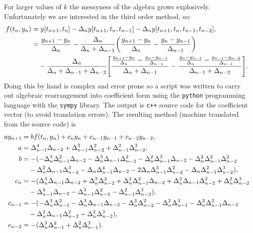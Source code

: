 For larger values of $k$ the messyness of the algebra grows explosively.
Unfortunately we are interested in the third order method, so:
\begin{equation}
  \begin{aligned}
    f(t_n, y_n) &= y[t_{n+1}, t_n] - \Delta_{n} y[t_{n+1}, t_n, t_{n-1}] -\Delta_{n} y[t_{n+1}, t_n, t_{n-1}, t_{n-2}], \\
    &=  \frac{y_{n+1} - y_n}{\Delta_{n}} 
    - \frac{\Delta_{n}}{\Delta_{n} + \Delta_{n-1}} {\left(  \frac{y_{n+1} - y_n}{\Delta_{n}} - \frac{y_n - y_{n-1}}{\Delta_{n-1}} \right)} \\
    &\quad - \frac{\Delta_{n}}{\Delta_{n} + \Delta_{n-1} + \Delta_{n-2}}
         {\left[ 
           \frac{\frac{y_{n+1} - y_n}{\Delta_{n}} - \frac{y_n - y_{n-1}}{\Delta_{n-1}}}
                {\Delta_{n} +\Delta_{n-1}}
           -
           \frac{\frac{y_{n} - y_{n-1}}{\Delta_{n}} - \frac{y_{n-1} - y_{n-2}}{\Delta_{n-1}}}
                {\Delta_{n-1} +\Delta_{n-2}}
          \right]}.
  \end{aligned}
\end{equation}
Doing this by hand is complex and error prone so a script was written to carry out algebraic rearrangement into coefficient form using the \texttt{python} programming language with the \texttt{sympy} library\cite{sympy}.
The output is \texttt{c++} source code for the coefficient vector (to avoid translation errors).
The resulting method (machine translated from the source code\cite[src/generic/explicit_timesteppers.cc:EBDF3::set_weights]{oomph-lib-source}) is
\begin{equation}
  \label{eqn:ebdf-coeffs}
  \begin{aligned}
    a y_{n+1} &= b f(t_n, y_n) + c_n y_n + c_{n-1} y_{n-1} + c_{n-2} y_{n-2}, \\
    a &= \Delta_{n-1}^4 \Delta_{n-2}  + \Delta_{n-1}^3 \Delta_{n-2}^2  
    + \Delta_{n-1}^2 \Delta_{n-2}^3 , \\
    b &= -(-\Delta_{n}^3 \Delta_{n-1}^2 \Delta_{n-2}  - \Delta_{n}^3 \Delta_{n-1} \Delta_{n-2}^2  
    - \Delta_{n}^2 \Delta_{n-1}^3 \Delta_{n-2}  
    - \Delta_{n}^2 \Delta_{n-1}^2 \Delta_{n-2}^2  \\
     & \quad - \Delta_{n}^2 \Delta_{n-1} \Delta_{n-2}^3  - \Delta_{n} \Delta_{n-1}^4 \Delta_{n-2}  
     - 2\Delta_{n} \Delta_{n-1}^3 \Delta_{n-2}^2  
     - \Delta_{n} \Delta_{n-1}^2 \Delta_{n-2}^3), \\ 
    c_n &= -(\Delta_{n}^3 \Delta_{n-1} \Delta_{n-2}  + \Delta_{n}^3 \Delta_{n-2}^2  
    + \Delta_{n}^2 \Delta_{n-1}^2 \Delta_{n-2}  
    + \Delta_{n}^2 \Delta_{n-1} \Delta_{n-2}^2  + \Delta_{n}^2 \Delta_{n-2}^3 \\
    &\quad - \Delta_{n-1}^4 \Delta_{n-2}  - \Delta_{n-1}^3 \Delta_{n-2}^2  
    - \Delta_{n-1}^2 \Delta_{n-2}^3 ), \\
    c_{n-1} & = -(-\Delta_{n}^3 \Delta_{n-1}^2  - \Delta_{n}^3 \Delta_{n-1} \Delta_{n-2}  
    - \Delta_{n}^3 \Delta_{n-2}^2  - \Delta_{n}^2 \Delta_{n-1}^3  
    - \Delta_{n}^2 \Delta_{n-1}^2 \Delta_{n-2} \\
    &\quad - \Delta_{n}^2 \Delta_{n-1} \Delta_{n-2}^2  
    - \Delta_{n}^2 \Delta_{n-2}^3 ), \\
    c_{n-2} &= -(\Delta_{n}^3 \Delta_{n-1}^2  + \Delta_{n}^2 \Delta_{n-1}^3 ).
  \end{aligned}
\end{equation}

